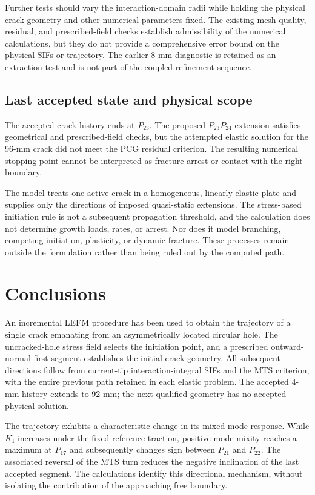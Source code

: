 \documentclass[11pt]{article}
\begin{document}
Further tests should vary the interaction-domain radii while
holding the physical crack geometry and other numerical parameters
fixed. The existing mesh-quality, residual, and prescribed-field
checks establish admissibility of the numerical calculations, but
they do not provide a comprehensive error bound on the physical
SIFs or trajectory. The earlier 8-mm diagnostic is retained as
an extraction test and is not part of the coupled refinement
sequence.

\subsection{Last accepted state and physical scope}
The accepted crack history ends at $P_{23}$. The proposed
$P_{23}P_{24}$ extension satisfies geometrical and
prescribed-field checks, but the attempted elastic solution
for the 96-mm crack did not meet the PCG residual criterion.
The resulting numerical stopping point cannot be interpreted
as fracture arrest or contact with the right boundary.

The model treats one active crack in a homogeneous,
linearly elastic plate and supplies only the directions
of imposed quasi-static extensions. The stress-based
initiation rule is not a subsequent propagation threshold,
and the calculation does not determine growth loads,
rates, or arrest. Nor does it model branching, competing
initiation, plasticity, or dynamic fracture. These processes
remain outside the formulation rather than being ruled out
by the computed path.

\section{Conclusions}
\label{sec:conclusions}
An incremental LEFM procedure has been used to obtain the
trajectory of a single crack emanating from an asymmetrically
located circular hole. The uncracked-hole stress field selects
the initiation point, and a prescribed outward-normal first
segment establishes the initial crack geometry. All subsequent
directions follow from current-tip interaction-integral SIFs
and the MTS criterion, with the entire previous path retained
in each elastic problem. The accepted 4-mm history extends to
92 mm; the next qualified geometry has no accepted physical
solution.

The trajectory exhibits a characteristic change in its
mixed-mode response. While $K_{\mathrm{I}}$ increases under
the fixed reference traction, positive mode mixity reaches
a maximum at $P_{17}$ and subsequently changes sign
between $P_{21}$ and $P_{22}$. The associated reversal
of the MTS turn reduces the negative inclination of
the last accepted segment. The calculations identify
this directional mechanism, without isolating the
contribution of the approaching free boundary.
\end{document}
